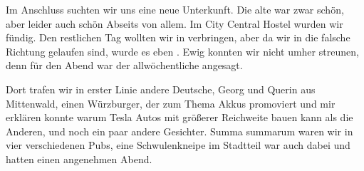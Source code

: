 \newpage
\thispagestyle{empty}

\vspace*{.35\paperheight}

Im Anschluss suchten wir uns eine neue Unterkunft.
Die alte war zwar schön, aber leider auch schön Abseits von allem.
Im City Central Hostel wurden wir fündig.
Den restlichen Tag wollten wir in  verbringen, aber da wir in die falsche Richtung gelaufen sind, wurde es eben .
Ewig konnten wir nicht umher streunen, denn für den Abend war der allwöchentliche  angesagt.

Dort trafen wir in erster Linie andere Deutsche, Georg und Querin aus Mittenwald, einen Würzburger, der zum Thema Akkus promoviert und mir erklären konnte warum Tesla Autos mit größerer Reichweite bauen kann als die Anderen, und noch ein paar andere Gesichter.
Summa summarum waren wir in vier verschiedenen Pubs, eine Schwulenkneipe im Stadtteil  war auch dabei und hatten einen angenehmen Abend.
